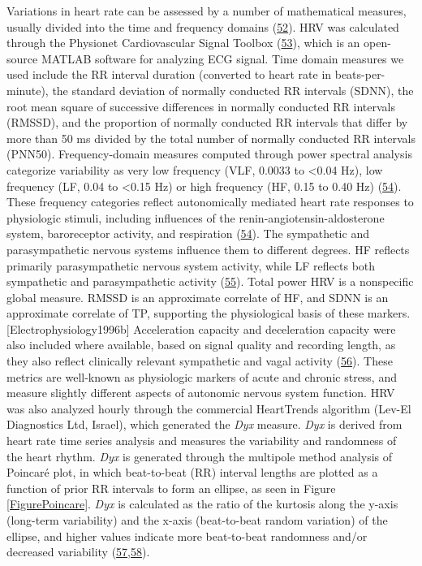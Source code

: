 \documentclass[
  11pt,
  openany]{book}
\begin{document}
Variations in heart rate can be assessed by a number of mathematical measures, usually divided into the time and frequency domains (\protect\hyperlink{ref-TaskForceoftheESCandNAS1996a}{52}).
HRV was calculated through the Physionet Cardiovascular Signal Toolbox (\protect\hyperlink{ref-Vest2018}{53}), which is an open-source MATLAB software for analyzing ECG signal.
Time domain measures we used include the RR interval duration (converted to heart rate in beats-per-minute), the standard deviation of normally conducted RR intervals (SDNN), the root mean square of successive differences in normally conducted RR intervals (RMSSD), and the proportion of normally conducted RR intervals that differ by more than 50 ms divided by the total number of normally conducted RR intervals (PNN50).
Frequency-domain measures computed through power spectral analysis categorize variability as very low frequency (VLF, 0.0033 to \textless0.04 Hz), low frequency (LF, 0.04 to \textless0.15 Hz) or high frequency (HF, 0.15 to 0.40 Hz) (\protect\hyperlink{ref-Akselrod1981}{54}).
These frequency categories reflect autonomically mediated heart rate responses to physiologic stimuli, including influences of the renin-angiotensin-aldosterone system, baroreceptor activity, and respiration (\protect\hyperlink{ref-Akselrod1981}{54}).
The sympathetic and parasympathetic nervous systems influence them to different degrees.
HF reflects primarily parasympathetic nervous system activity, while LF reflects both sympathetic and parasympathetic activity (\protect\hyperlink{ref-ReyesdelPaso2013}{55}).
Total power HRV is a nonspecific global measure.
RMSSD is an approximate correlate of HF, and SDNN is an approximate correlate of TP, supporting the physiological basis of these markers.{[}Electrophysiology1996b{]}
Acceleration capacity and deceleration capacity were also included where available, based on signal quality and recording length, as they also reflect clinically relevant sympathetic and vagal activity (\protect\hyperlink{ref-Bauer2006c}{56}).
These metrics are well-known as physiologic markers of acute and chronic stress, and measure slightly different aspects of autonomic nervous system function.
HRV was also analyzed hourly through the commercial HeartTrends algorithm (Lev-El Diagnostics Ltd, Israel), which generated the \emph{Dyx} measure.
\emph{Dyx} is derived from heart rate time series analysis and measures the variability and randomness of the heart rhythm.
\emph{Dyx} is generated through the multipole method analysis of Poincaré plot, in which beat-to-beat (RR) interval lengths are plotted as a function of prior RR intervals to form an ellipse, as seen in Figure \ref{FigurePoincare}.
\emph{Dyx} is calculated as the ratio of the kurtosis along the y-axis (long-term variability) and the x-axis (beat-to-beat random variation) of the ellipse, and higher values indicate more beat-to-beat randomness and/or decreased variability (\protect\hyperlink{ref-Olesen2005}{57},\protect\hyperlink{ref-Lewkowicz2002}{58}).
\end{document}
